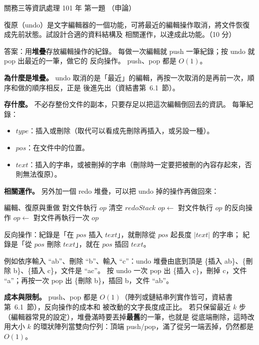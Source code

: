 \begin{pastexam}[label={px:gw3-101-ds-01}]{關務三等資訊處理 101 年 第一題}
（申論）

復原（undo）是文字編輯器的一個功能，可將最近的編輯操作取消，將文件恢復成先前狀態。試設計合適的資料結構及
相關運作，以達成此功能。（10 分）
\end{pastexam}

\begin{pastsoln}
答案：用\textbf{堆疊}存放編輯操作的紀錄。 每做一次編輯就 push 一筆紀錄；按 undo 就 pop 出最近的一筆，做它的
反向操作。 push、pop 都是 $O(1)$。

\textbf{為什麼是堆疊。} undo 取消的是「最近」的編輯，再按一次取消的是再前一次，順序和做的順序相反，正是
後進先出（資結書第~6.1~節）。

\textbf{存什麼。} 不必存整份文件的副本，只要存足以把這次編輯倒回去的資訊。 每筆紀錄：
\begin{itemize}
\item $\mathit{type}$：插入或刪除（取代可以看成先刪除再插入，或另設一種）。
\item $\mathit{pos}$：在文件中的位置。
\item $\mathit{text}$：插入的字串，或被刪掉的字串（刪除時一定要把被刪的內容存起來，否則無法復原）。
\end{itemize}

\textbf{相關運作。} 另外加一個 redo 堆疊，可以把 undo 掉的操作再做回來：
\begin{pseudo}{編輯、復原與重做}
    \State 對文件執行 $\mathit{op}$
    \State {}
    \State 清空 $\mathit{redoStack}$ 
\EndProcedure
{}
        \State \Return {}
    \EndIf
    \State $\mathit{op} \gets$ 
    \State 對文件執行 $\mathit{op}$ 的反向操作 
    \State {}
\EndProcedure
{}
        \State \Return
    \EndIf
    \State $\mathit{op} \gets$ 
    \State 對文件再執行一次 $\mathit{op}$
    \State {}
\EndProcedure
\end{pseudo}
反向操作：紀錄是「在 $\mathit{pos}$ 插入 $\mathit{text}$」，就刪除從 $\mathit{pos}$ 起長度 $|\mathit{text}|$ 的字串；
紀錄是「從 $\mathit{pos}$ 刪除 $\mathit{text}$」，就在 $\mathit{pos}$ 插回 $\mathit{text}$。

例如依序輸入 ``ab''、刪除 ``b''、輸入 ``c''：undo 堆疊由底到頂是 \{插入 ab\}、\{刪除 b\}、\{插入 c\}，文件是 ``ac''。
按 undo 一次 pop 出 \{插入 c\}，刪掉 c，文件 ``a''；再按一次 pop 出 \{刪除 b\}，插回 b，文件 ``ab''。

\textbf{成本與限制。} push、pop 都是 $O(1)$（陣列或鏈結串列實作皆可，資結書第~6.1~節），反向操作的成本和
被改動的文字長度成正比。 若只保留最近 $k$ 步（編輯器常見的設定），堆疊滿時要丟掉\textbf{最舊}的一筆，也就是
從底端刪除，這時改用大小 $k$ 的環狀陣列當雙向佇列：頂端 push/pop，滿了從另一端丟掉，仍然都是 $O(1)$。
\end{pastsoln}
